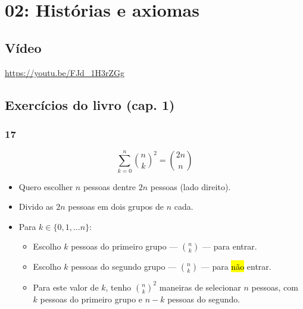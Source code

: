 \documentclass[
  11pt]{report}
\begin{document}
\hypertarget{histuxf3rias-e-axiomas}{%
\chapter*{02: Histórias e axiomas}\label{histuxf3rias-e-axiomas}}

\hypertarget{vuxeddeo-1}{%
\section*{Vídeo}\label{vuxeddeo-1}}

\begin{center} \url{https://youtu.be/FJd_1H3rZGg} \end{center}

\hypertarget{exercuxedcios-do-livro-cap.-1}{%
\section*{Exercícios do livro (cap. 1)}\label{exercuxedcios-do-livro-cap.-1}}

\hypertarget{section}{%
\subsection*{17}\label{section}}

\begin{rmdbox}
\[
\sum_{k = 0}^n \binom{n}{k}^2 = \binom{2n}{n}
\]

\end{rmdbox}

\begin{itemize}
\item
  Quero escolher $n$ pessoas dentre $2n$ pessoas (lado direito).
\item
  Divido as $2n$ pessoas em dois grupos de $n$ cada.
\item
  Para $k \in \{0, 1, \ldots n\}$:

  \begin{itemize}
  \item
    Escolho $k$ pessoas do primeiro grupo --- $\binom{n}{k}$ --- para entrar.
  \item
    Escolho $k$ pessoas do segundo grupo --- $\binom{n}{k}$ --- para {\hl{não}} entrar.
  \item
    Para este valor de $k$, tenho $\binom{n}{k}^2$ maneiras de selecionar $n$ pessoas, com $k$ pessoas do primeiro grupo e $n-k$ pessoas do segundo.
  \end{itemize}
\end{itemize}
\end{document}
